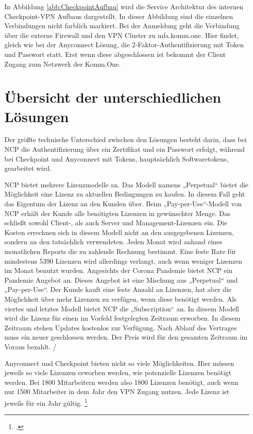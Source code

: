 In Abbildung \ref{abb:CheckpointAufbau} wird die Service Architektur des internen Checkpoint-VPN Aufbaus dargestellt. In dieser Abbildung sind die einzelnen Verbindungen nicht farblich markiert. Bei der Anmeldung geht die Verbindung über die externe Firewall und den VPN Cluster zu mfa.komm.one. Hier findet, gleich wie bei der Anyconnect Lösung, die 2-Faktor-Authentifizierung mit Token und Passwort statt. Erst wenn diese abgeschlossen ist bekommt der Client Zugang zum Netzwerk der Komm.One.


\section{Übersicht der unterschiedlichen Lösungen} %
\label{sec:Übersicht der unterschiedlichen Lösungen}

Der größte technische Unterschied zwischen den Lösungen besteht darin, dass bei NCP die Authentifizierung über ein Zertifikat und ein Passwort erfolgt, während bei Checkpoint und Anyconnect mit Tokens, hauptsächlich Softwaretokens, gearbeitet wird. 

NCP bietet mehrere Lizenzmodelle an. Das Modell namens „Perpetual“ bietet die Möglichkeit eine Lizenz zu aktuellen Bedingungen zu kaufen. In diesem Fall geht das Eigentum der Lizenz an den Kunden über. Beim „Pay-per-Use“-Modell von NCP erhält der Kunde alle benötigten Lizenzen in gewünschter Menge. Das schließt sowohl Client-, als auch Server und Management-Lizenzen ein. Die Kosten errechnen sich in diesem Modell nicht an den ausgegebenen Lizenzen, sondern an den tatsächlich verwendeten. Jeden Monat wird anhand eines monatlichen Reports die zu zahlende Rechnung bestimmt. Eine feste Rate für mindestens 5390 Lizenzen wird allerdings verlangt, auch wenn weniger Lizenzen im Monat benutzt wurden. Angesichts der Corona Pandemie bietet NCP ein Pandemie Angebot an. Dieses Angebot ist eine Mischung aus „Perpetual“ und „Pay-per-Use“. Der Kunde kauft eine feste Anzahl an Lizenzen, hat aber die Möglichkeit über mehr Lizenzen zu verfügen, wenn diese benötigt werden. Als viertes und letztes Modell bietet NCP die „Subscription“ an. In diesem Modell wird die Lizenz für einen im Vorfeld festgelegten Zeitraum erworben. In diesem Zeitraum stehen Updates kostenlos zur Verfügung. Nach Ablauf des Vertrages muss ein neuer geschlossen werden. Der Preis wird für den gesamten Zeitraum im Voraus bezahlt. \footnotemark
/

Anyconnect und Checkpoint bieten nicht so viele Möglichkeiten. Hier müssen jeweils so viele Lizenzen erworben werden, wie potenzielle Lizenzen benötigt werden. Bei 1800 Mitarbeitern werden also 1800 Lizenzen benötigt, auch wenn nur 1500 Mitarbeiter in dem Jahr den VPN Zugang nutzen. Jede Lizenz ist jeweils für ein Jahr gültig. \footcite[Vgl.][]{CheckPointSoftware.2022}


